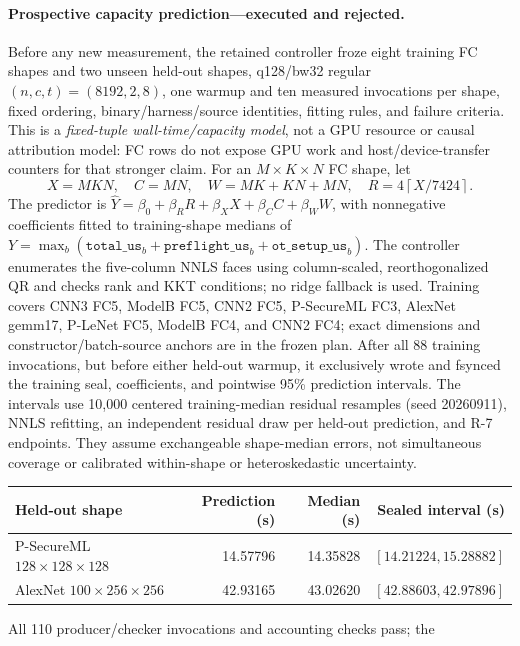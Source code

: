 \documentclass[11pt]{article}
\begin{document}
\paragraph{Prospective capacity prediction---executed and rejected.}
\label{sec:capacity-review}
Before any new measurement, the retained controller froze eight training
FC shapes and two unseen held-out shapes, q128/bw32 regular
$(n,c,t)=(8192,2,8)$, one warmup and ten measured invocations per shape,
fixed ordering, binary/harness/source identities, fitting rules, and failure
criteria. This is a \emph{fixed-tuple wall-time/capacity model}, not a GPU
resource or causal attribution model: FC rows do not expose GPU work and
host/device-transfer counters for that stronger claim.
For an $M\times K\times N$ FC shape, let
\[
 X=MKN,\quad C=MN,\quad W=MK+KN+MN,\quad
 R=4\left\lceil X/7424\right\rceil .
\]
The predictor is $\widehat{Y}=\beta_0+\beta_R R+\beta_X X+\beta_C C+\beta_W W$,
with nonnegative coefficients fitted to training-shape medians of
$Y=\max_b(\texttt{total\_us}_b+\texttt{preflight\_us}_b+\texttt{ot\_setup\_us}_b)$.
The controller enumerates the five-column NNLS faces using column-scaled,
reorthogonalized QR and checks rank and KKT conditions; no ridge fallback is used.
Training covers CNN3 FC5, ModelB FC5, CNN2 FC5, P-SecureML FC3,
AlexNet gemm17, P-LeNet FC5, ModelB FC4, and CNN2 FC4; exact dimensions
and constructor/batch-source anchors are in the frozen plan.
After all 88 training invocations, but before either held-out warmup, it
exclusively wrote and fsynced the training seal, coefficients, and pointwise
95\% prediction intervals. The intervals use 10,000 centered training-median
residual resamples (seed 20260911), NNLS refitting, an independent residual
draw per held-out prediction, and R-7 endpoints. They assume exchangeable
shape-median errors, not simultaneous coverage or calibrated within-shape
or heteroskedastic uncertainty.
\begin{center}
\begin{tabular}{lrrr}
\toprule
Held-out shape & Prediction (s) & Median (s) & Sealed interval (s)\\
\midrule
P-SecureML $128\times128\times128$ & 14.57796 & 14.35828 & $[14.21224,15.28882]$\\
AlexNet $100\times256\times256$ & 42.93165 & 43.02620 & $[42.88603,42.97896]$\\
\bottomrule
\end{tabular}
\end{center}
All 110 producer/checker invocations and accounting checks pass; the
\end{document}
